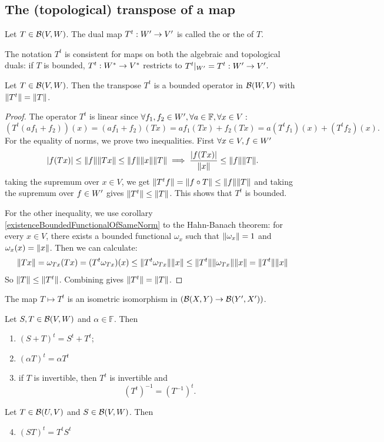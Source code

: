 \subsection{The (topological) transpose of a map}
\begin{definition}
Let $T\in\operatorname{\mathcal{B}}(V,W)$. The dual map $T^t: {W}^\prime\to {V}^\prime$ is called the  or the  of $T$.
\end{definition}
The notation $T^t$ is consistent for maps on both the algebraic and topological duals: if $T$ is bounded, $T^t:{W}^*\to {V}^*$ restricts to $T^t|_{{W}^\prime} = T^t:{W}^\prime\to {V}^\prime$.

\begin{proposition}
Let $T\in\operatorname{\mathcal{B}}(V,W)$. Then the transpose $T^t$ is a bounded operator in $\operatorname{\mathcal{B}}(W,V)$ with $\lVert T^t\rVert = \lVert T\rVert$.
\end{proposition}
\begin{proof}
The operator $T^t$ is linear since $\forall f_1,f_2\in {W}^\prime, \forall a\in\mathbb{F}, \forall x\in V:$
\[ (T^t(af_1 + f_2))(x) = (af_1 + f_2)(Tx) = af_1(Tx) + f_2(Tx) = a(T^tf_1)(x) + (T^tf_2)(x). \]
For the equality of norms, we prove two inequalities. First $\forall x\in V, f\in {W}^\prime$
\[ |f(Tx)|\leq \lVert f\rVert\lVert Tx\rVert\leq \lVert f\rVert\lVert x\rVert\lVert T\rVert \implies \frac{|f(Tx)|}{\lVert x\rVert} \leq \lVert f\rVert\lVert T\rVert. \]
taking the supremum over $x\in V$, we get $\lVert T^tf\rVert = \lVert f\circ T\rVert\leq \lVert f\rVert\lVert T\rVert$ and taking the supremum over $f\in {W}^\prime$ gives $\lVert T^t\rVert\leq \lVert T\rVert$. This shows that $T^t$ is bounded.

For the other inequality, we use corollary \ref{existenceBoundedFunctionalOfSameNorm} to the Hahn-Banach theorem: for every $x\in V$, there exists a bounded functional $\omega_x$ such that $\lVert\omega_x\rVert=1$ and $\omega_x(x) = \lVert x\rVert$. Then we can calculate:
\begin{align*}
\lVert Tx\rVert = \omega_{Tx}(Tx) = (T^t\omega_{Tx})(x) \leq \lVert T^t\omega_{Tx}\rVert\lVert x\rVert \leq \lVert T^t\rVert\lVert\omega_{Tx}\rVert\lVert x\rVert = \lVert T^t\rVert\lVert x\rVert
\end{align*}
So $\lVert T\rVert\leq\lVert T^t\rVert$. Combining gives $\lVert T^t\rVert=\lVert T\rVert$.
\end{proof}
\begin{corollary}
The map $T\mapsto T^t$ is an isometric isomorphism in $(\operatorname{\mathcal{B}}(X,Y)\to \operatorname{\mathcal{B}}({Y}^\prime, {X}^\prime))$.
\end{corollary}

\begin{lemma}
Let $S,T\in\operatorname{\mathcal{B}}(V,W)$ and $\alpha\in\mathbb{F}$. Then
\begin{enumerate}
\item $(S+T)^t = S^t+T^t$;
\item $(\alpha T)^t = \alpha T^t$
\item if $T$ is invertible, then $T^t$ is invertible and
\[ (T^t)^{-1} = (T^{-1})^t. \]
\end{enumerate}
Let $T\in\operatorname{\mathcal{B}}(U,V)$ and $S\in\operatorname{\mathcal{B}}(V,W)$. Then
\begin{enumerate}
\setcounter{enumi}{3}
\item $(ST)^t = T^tS^t$
\end{enumerate}
\end{lemma}

